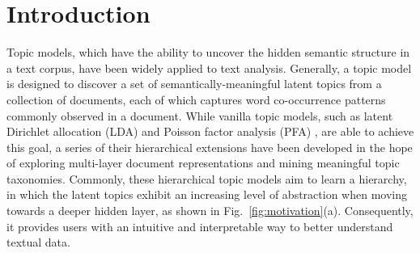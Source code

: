 \documentclass{article}
\begin{document}
\section{Introduction} \label{sec:introduction}
Topic models, which have the ability to uncover the hidden semantic structure in a text corpus, have been widely applied to text analysis. %
Generally, a topic model is designed to discover a set of semantically-meaningful latent topics from a collection of documents, each of which captures word co-occurrence patterns commonly observed in a document. %
While vanilla topic models, such as latent Dirichlet allocation (LDA) \cite{blei2003latent} and Poisson factor analysis (PFA) \cite{zhou2012beta}, are able to achieve this goal, a series of their hierarchical extensions \cite{blei2010nested, paisley2014nested, gan2015scalable, zhou2016augmentable, cong2017deep, zhao2018Dirichlet,guo2018deep,wang2018multimodal,wang2019convolutional,wang2020deep} have been developed in the hope of exploring multi-layer document representations and mining meaningful topic taxonomies. 
Commonly, these hierarchical topic models aim to learn a hierarchy, in which the latent topics exhibit an increasing level of abstraction when moving towards a deeper hidden layer, as shown in Fig.~\ref{fig:motivation}(a). 
Consequently, it provides users with an intuitive and interpretable way to better understand textual data.
\end{document}
